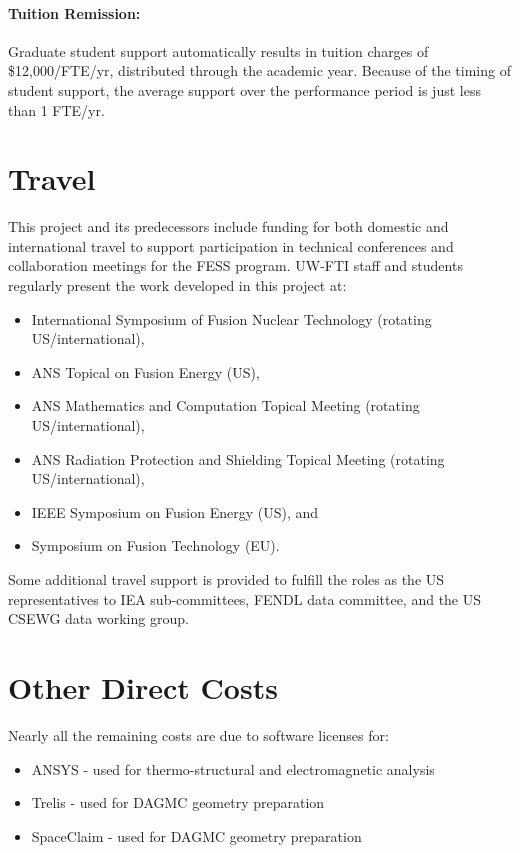 \paragraph{Tuition Remission:} Graduate student support automatically results
in tuition charges of \$12,000/FTE/yr, distributed through the academic year.
Because of the timing of student support, the average support over the
performance period is just less than 1 FTE/yr.

\section{Travel}

This project and its predecessors include funding for both domestic and
international travel to support participation in technical conferences and
collaboration meetings for the \gls{FESS} program. \gls{UW-FTI} staff and
students regularly present the work developed in this project at:
\begin{itemize}
\item International Symposium of Fusion Nuclear Technology (rotating US/international),
\item ANS Topical on Fusion Energy (US),
\item ANS Mathematics and Computation Topical Meeting (rotating US/international),
\item ANS Radiation Protection and Shielding Topical Meeting (rotating
  US/international),
\item IEEE Symposium on Fusion Energy (US), and
\item Symposium on Fusion Technology (EU).
\end{itemize}

Some additional travel support is provided to fulfill the roles as the US
representatives to IEA sub-committees, FENDL data committee, and the US
\gls{CSEWG} data working group.

\section{Other Direct Costs}

Nearly all the remaining costs are due to software licenses for:
\begin{itemize}
\item ANSYS - used for thermo-structural and electromagnetic analysis
\item Trelis - used for DAGMC geometry preparation
\item SpaceClaim - used for DAGMC geometry preparation
\end{itemize}
